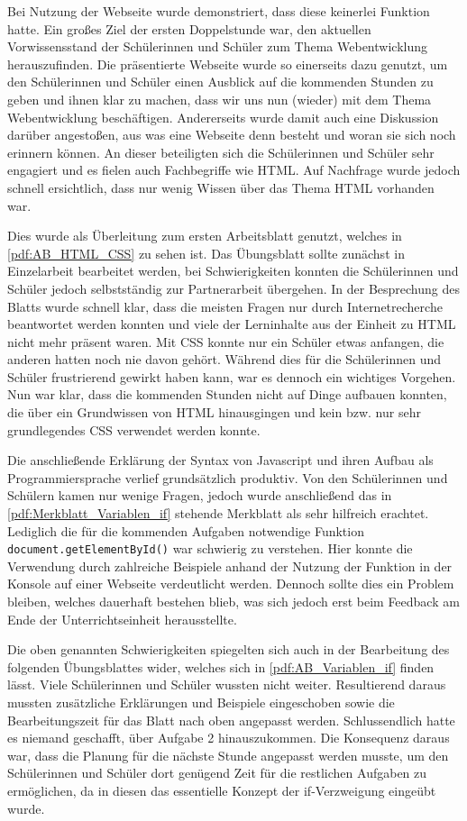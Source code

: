 Bei Nutzung der Webseite wurde demonstriert, dass diese keinerlei Funktion hatte.
Ein großes Ziel der ersten Doppelstunde war, den aktuellen Vorwissensstand der Schülerinnen und Schüler zum Thema Webentwicklung herauszufinden.
Die präsentierte Webseite wurde so einerseits dazu genutzt, um den Schülerinnen und Schüler einen Ausblick auf die kommenden Stunden zu geben und ihnen klar zu machen, dass wir uns nun (wieder) mit dem Thema Webentwicklung beschäftigen.
Andererseits wurde damit auch eine Diskussion darüber angestoßen, aus was eine Webseite denn besteht und woran sie sich noch erinnern können.
An dieser beteiligten sich die Schülerinnen und Schüler sehr engagiert und es fielen auch Fachbegriffe wie HTML.
Auf Nachfrage wurde jedoch schnell ersichtlich, dass nur wenig Wissen über das Thema HTML vorhanden war.

Dies wurde als Überleitung zum ersten Arbeitsblatt genutzt, welches in \autoref{pdf:AB_HTML_CSS} zu sehen ist.
Das Übungsblatt sollte zunächst in Einzelarbeit bearbeitet werden, bei Schwierigkeiten konnten die Schülerinnen und Schüler jedoch selbstständig zur Partnerarbeit übergehen.
In der Besprechung des Blatts wurde schnell klar, dass die meisten Fragen nur durch Internetrecherche beantwortet werden konnten und viele der Lerninhalte aus der Einheit zu HTML nicht mehr präsent waren.
Mit CSS konnte nur ein Schüler etwas anfangen, die anderen hatten noch nie davon gehört.
Während dies für die Schülerinnen und Schüler frustrierend gewirkt haben kann, war es dennoch ein wichtiges Vorgehen.
Nun war klar, dass die kommenden Stunden nicht auf Dinge aufbauen konnten, die über ein Grundwissen von HTML hinausgingen und kein bzw. nur sehr grundlegendes CSS verwendet werden konnte.

Die anschließende Erklärung der Syntax von Javascript und ihren Aufbau als Programmiersprache verlief grundsätzlich produktiv.
Von den Schülerinnen und Schülern kamen nur wenige Fragen, jedoch wurde anschließend das in \autoref{pdf:Merkblatt_Variablen_if} stehende Merkblatt als sehr hilfreich erachtet.
Lediglich die für die kommenden Aufgaben notwendige Funktion \texttt{document.getElementById()} war schwierig zu verstehen.
Hier konnte die Verwendung durch zahlreiche Beispiele anhand der Nutzung der Funktion in der Konsole auf einer Webseite verdeutlicht werden.
Dennoch sollte dies ein Problem bleiben, welches dauerhaft bestehen blieb, was sich jedoch erst beim Feedback am Ende der Unterrichtseinheit herausstellte.

Die oben genannten Schwierigkeiten spiegelten sich auch in der Bearbeitung des folgenden Übungsblattes wider, welches sich in \autoref{pdf:AB_Variablen_if} finden lässt.
Viele Schülerinnen und Schüler wussten nicht weiter.
Resultierend daraus mussten zusätzliche Erklärungen und Beispiele eingeschoben sowie die Bearbeitungszeit für das Blatt nach oben angepasst werden.
Schlussendlich hatte es niemand geschafft, über Aufgabe 2 hinauszukommen.
Die Konsequenz daraus war, dass die Planung für die nächste Stunde angepasst werden musste, um den Schülerinnen und Schüler dort genügend Zeit für die restlichen Aufgaben zu ermöglichen, da in diesen das essentielle Konzept der if-Verzweigung eingeübt wurde.

